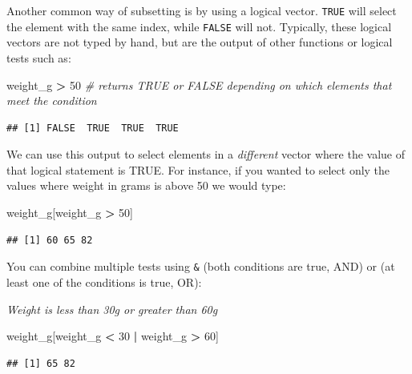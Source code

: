 \documentclass[
]{article}
\newenvironment{Shaded}{\begin{snugshade}}{\end{snugshade}}
\newcommand{\CommentTok}[1]{\textcolor[rgb]{0.56,0.35,0.01}{\textit{#1}}}
\newcommand{\DecValTok}[1]{\textcolor[rgb]{0.00,0.00,0.81}{#1}}
\newcommand{\NormalTok}[1]{#1}
\newcommand{\OperatorTok}[1]{\textcolor[rgb]{0.81,0.36,0.00}{\textbf{#1}}}
\newcommand{\StringTok}[1]{\textcolor[rgb]{0.31,0.60,0.02}{#1}}
\begin{document}
Another common way of subsetting is by using a logical vector.
\texttt{TRUE} will select the element with the same index, while
\texttt{FALSE} will not. Typically, these logical vectors are not typed
by hand, but are the output of other functions or logical tests such as:

\begin{Shaded}
\begin{Highlighting}[]
\NormalTok{weight_g }\OperatorTok{>}\StringTok{ }\DecValTok{50}  \CommentTok{# returns TRUE or FALSE depending on which elements that meet the condition}
\end{Highlighting}
\end{Shaded}

\begin{verbatim}
## [1] FALSE  TRUE  TRUE  TRUE
\end{verbatim}

We can use this output to select elements in a \emph{different} vector
where the value of that logical statement is TRUE. For instance, if you
wanted to select only the values where weight in grams is above 50 we
would type:

\begin{Shaded}
\begin{Highlighting}[]
\NormalTok{weight_g[weight_g }\OperatorTok{>}\StringTok{ }\DecValTok{50}\NormalTok{]}
\end{Highlighting}
\end{Shaded}

\begin{verbatim}
## [1] 60 65 82
\end{verbatim}

You can combine multiple tests using \texttt{\&} (both conditions are
true, AND) or \texttt{\textbar{}} (at least one of the conditions is
true, OR):

\emph{Weight is less than 30g or greater than 60g}

\begin{Shaded}
\begin{Highlighting}[]
\NormalTok{weight_g[weight_g }\OperatorTok{<}\StringTok{ }\DecValTok{30} \OperatorTok{|}\StringTok{ }\NormalTok{weight_g }\OperatorTok{>}\StringTok{ }\DecValTok{60}\NormalTok{]}
\end{Highlighting}
\end{Shaded}

\begin{verbatim}
## [1] 65 82
\end{verbatim}
\end{document}
